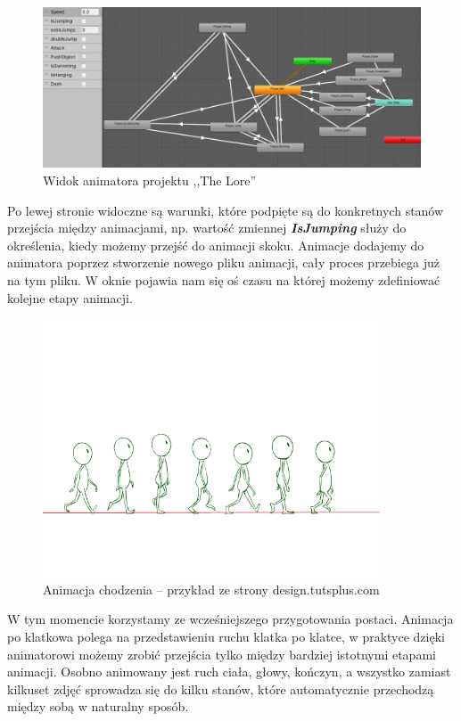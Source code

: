 \documentclass[oneside,polski,logo]{amuthesis}
\begin{document}
\begin{figure}[h]
	\centering
	\includegraphics[width=13cm]{images/kozubal/animator.jpg}
	\caption{Widok animatora projektu ,,The Lore''}
\end{figure}

Po lewej stronie widoczne są warunki, które podpięte są do konkretnych stanów przejścia między animacjami, np. wartość zmiennej \textbf{\textit{IsJumping}} służy do określenia, kiedy możemy przejść do animacji skoku. Animacje dodajemy do animatora poprzez stworzenie nowego pliku animacji, cały proces przebiega już na tym pliku. W oknie pojawia nam się oś czasu na której możemy zdefiniować kolejne etapy animacji.\\

\begin{figure}[h]
	\centering
	\includegraphics[width=10cm]{images/kozubal/walkingAnimation.jpg}
	\caption{Animacja chodzenia – przykład ze strony design.tutsplus.com \cite{animation2}}
\end{figure}

\newpage W tym momencie korzystamy ze wcześniejszego przygotowania postaci. Animacja po klatkowa polega na przedstawieniu ruchu klatka po klatce, w praktyce dzięki animatorowi możemy zrobić przejścia tylko między bardziej istotnymi etapami animacji. Osobno animowany jest ruch ciała, głowy, kończyn, a wszystko zamiast kilkuset zdjęć sprowadza się do kilku stanów, które automatycznie przechodzą między sobą w naturalny sposób.
\end{document}
